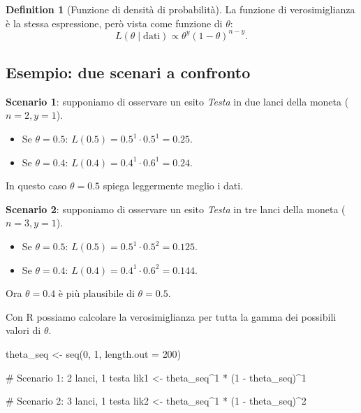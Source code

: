 \documentclass[
  letterpaper,
  DIV=11,
  numbers=noendperiod,
  oneside]{scrreprt}
\newenvironment{Shaded}{\begin{snugshade}}{\end{snugshade}}
\newcommand{\AttributeTok}[1]{\textcolor[rgb]{0.40,0.45,0.13}{#1}}
\newcommand{\CommentTok}[1]{\textcolor[rgb]{0.37,0.37,0.37}{#1}}
\newcommand{\DecValTok}[1]{\textcolor[rgb]{0.68,0.00,0.00}{#1}}
\newcommand{\FunctionTok}[1]{\textcolor[rgb]{0.28,0.35,0.67}{#1}}
\newcommand{\NormalTok}[1]{\textcolor[rgb]{0.00,0.23,0.31}{#1}}
\newcommand{\OtherTok}[1]{\textcolor[rgb]{0.00,0.23,0.31}{#1}}
\newcommand{\SpecialCharTok}[1]{\textcolor[rgb]{0.37,0.37,0.37}{#1}}
\providecommand{\tightlist}{%
  \setlength{\itemsep}{0pt}\setlength{\parskip}{0pt}}
\theoremstyle{definition}
\theoremstyle{plain}
\theoremstyle{definition}
\newtheorem{definition}{Definition}[chapter]
\theoremstyle{remark}
\begin{document}
\begin{definition}[Funzione di densità di
probabilità]
La funzione di verosimiglianza è la stessa espressione, però vista come
funzione di \(\theta\): \[
L(\theta \mid \text{dati}) \propto \theta^y (1-\theta)^{n-y}.
\]

\subsection{Esempio: due scenari a
confronto}\label{esempio-due-scenari-a-confronto}

\textbf{Scenario 1}: supponiamo di osservare un esito \emph{Testa} in
due lanci della moneta (\(n=2, y=1\)).

\begin{itemize}
\tightlist
\item
  Se \(\theta = 0.5\): \(L(0.5) = 0.5^1 \cdot 0.5^1 = 0.25.\)
\item
  Se \(\theta = 0.4\): \(L(0.4) = 0.4^1 \cdot 0.6^1 = 0.24.\)
\end{itemize}

In questo caso \(\theta=0.5\) spiega leggermente meglio i dati.

\textbf{Scenario 2}: supponiamo di osservare un esito \emph{Testa} in
tre lanci della moneta (\(n=3, y=1\)).

\begin{itemize}
\tightlist
\item
  Se \(\theta = 0.5\): \(L(0.5) = 0.5^1 \cdot 0.5^2 = 0.125\).
\item
  Se \(\theta = 0.4\): \(L(0.4) = 0.4^1 \cdot 0.6^2 = 0.144\).
\end{itemize}

Ora \(\theta = 0.4\) è più plausibile di \(\theta = 0.5\).

Con R possiamo calcolare la verosimiglianza per tutta la gamma dei
possibili valori di \(\theta\).

\begin{Shaded}
\begin{Highlighting}[]
\NormalTok{theta\_seq }\OtherTok{\textless{}{-}} \FunctionTok{seq}\NormalTok{(}\DecValTok{0}\NormalTok{, }\DecValTok{1}\NormalTok{, }\AttributeTok{length.out =} \DecValTok{200}\NormalTok{)}

\CommentTok{\# Scenario 1: 2 lanci, 1 testa}
\NormalTok{lik1 }\OtherTok{\textless{}{-}}\NormalTok{ theta\_seq}\SpecialCharTok{\^{}}\DecValTok{1} \SpecialCharTok{*}\NormalTok{ (}\DecValTok{1} \SpecialCharTok{{-}}\NormalTok{ theta\_seq)}\SpecialCharTok{\^{}}\DecValTok{1}

\CommentTok{\# Scenario 2: 3 lanci, 1 testa  }
\NormalTok{lik2 }\OtherTok{\textless{}{-}}\NormalTok{ theta\_seq}\SpecialCharTok{\^{}}\DecValTok{1} \SpecialCharTok{*}\NormalTok{ (}\DecValTok{1} \SpecialCharTok{{-}}\NormalTok{ theta\_seq)}\SpecialCharTok{\^{}}\DecValTok{2}


\end{Highlighting}
\end{Shaded}
\end{definition}
\end{document}
